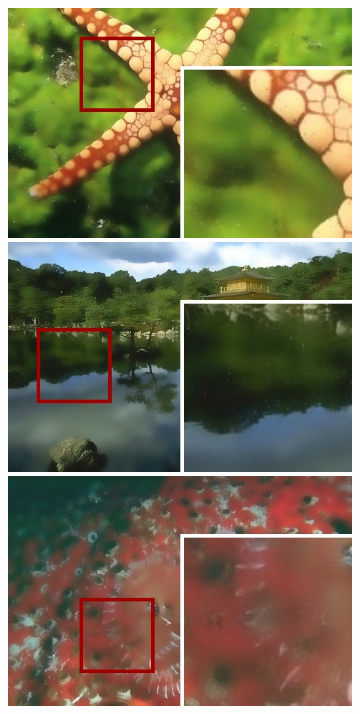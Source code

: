 \begin{figure}[!ht]
\begin{subfigure}[]{0.22\textwidth}
    \includegraphics[width=\textwidth]{./figures/sensor/berkeley/12003_bilateral_frame.jpg}\vspace{0.1cm}\\
    \includegraphics[width=\textwidth]{./figures/sensor/berkeley/65010_bilateral_frame.jpg}\vspace{0.1cm}\\
    \includegraphics[width=\textwidth]{./figures/sensor/berkeley/12084_bilateral_frame.jpg}\vspace{0.1cm}\\

\end{subfigure}
\end{figure}
